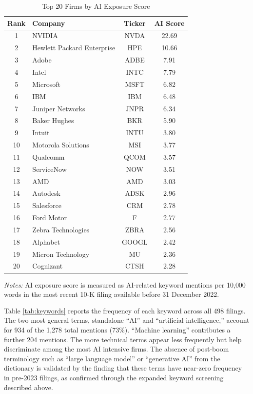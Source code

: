 \begin{table}[H]
\centering
\caption{Top 20 Firms by AI Exposure Score}
\label{tab:top20}
\small
\begin{tabular}{clcc}
\toprule
Rank & Company & Ticker & AI Score \\
\midrule
1  & NVIDIA             & NVDA  & 22.69 \\
2  & Hewlett Packard Enterprise & HPE & 10.66 \\
3  & Adobe               & ADBE  & 7.91 \\
4  & Intel               & INTC  & 7.79 \\
5  & Microsoft           & MSFT  & 6.82 \\
6  & IBM                 & IBM   & 6.48 \\
7  & Juniper Networks    & JNPR  & 6.34 \\
8  & Baker Hughes        & BKR   & 5.90 \\
9  & Intuit              & INTU  & 3.80 \\
10 & Motorola Solutions  & MSI   & 3.77 \\
11 & Qualcomm            & QCOM  & 3.57 \\
12 & ServiceNow          & NOW   & 3.51 \\
13 & AMD                 & AMD   & 3.03 \\
14 & Autodesk            & ADSK  & 2.96 \\
15 & Salesforce          & CRM   & 2.78 \\
16 & Ford Motor          & F     & 2.77 \\
17 & Zebra Technologies  & ZBRA  & 2.56 \\
18 & Alphabet            & GOOGL & 2.42 \\
19 & Micron Technology   & MU    & 2.36 \\
20 & Cognizant           & CTSH  & 2.28 \\
\bottomrule
\end{tabular}
\vspace{0.4em}
\begin{minipage}{0.95\linewidth}
\footnotesize
\textit{Notes:} AI exposure score is measured as AI-related keyword mentions per 10{,}000 words in the most recent 10-K filing available before 31 December 2022.
\end{minipage}
\end{table}

Table \ref{tab:keywords} reports the frequency of each keyword across all 498 filings. The two most general terms, standalone ``AI'' and ``artificial intelligence,'' account for 934 of the 1{,}278 total mentions (73\%). ``Machine learning'' contributes a further 204 mentions. The more technical terms appear less frequently but help discriminate among the most AI intensive firms. The absence of post-boom terminology such as ``large language model'' or ``generative AI'' from the dictionary is validated by the finding that these terms have near-zero frequency in pre-2023 filings, as confirmed through the expanded keyword screening described above.

